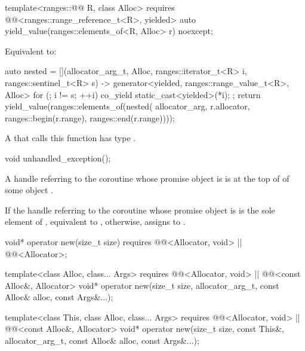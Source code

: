 %
\begin{itemdecl}
template<ranges::@@ R, class Alloc>
  requires @@<ranges::range_reference_t<R>, yielded>
  auto yield_value(ranges::elements_of<R, Alloc> r) noexcept;
\end{itemdecl}

\begin{itemdescr}
\pnum
\effects
Equivalent to:
\begin{codeblock}
auto nested = [](allocator_arg_t, Alloc, ranges::iterator_t<R> i, ranges::sentinel_t<R> s)
  -> generator<yielded, ranges::range_value_t<R>, Alloc> {
    for (; i != s; ++i) {
      co_yield static_cast<yielded>(*i);
    }
  };
return yield_value(ranges::elements_of(nested(
  allocator_arg, r.allocator, ranges::begin(r.range), ranges::end(r.range))));
\end{codeblock}

\pnum
\begin{note}
A  that calls this function
has type .
\end{note}
\end{itemdescr}

%
\begin{itemdecl}
void unhandled_exception();
\end{itemdecl}

\begin{itemdescr}
\pnum
\expects
A handle referring to the coroutine whose promise object is 
is at the top of 
of some  object .

\pnum
\effects
If the handle referring to the coroutine
whose promise object is 
is the sole element of ,
equivalent to ,
otherwise, assigns  to .
\end{itemdescr}

%
\begin{itemdecl}
void* operator new(size_t size)
  requires @@<Allocator, void> || @@<Allocator>;

template<class Alloc, class... Args>
  requires @@<Allocator, void> || @@<const Alloc&, Allocator>
  void* operator new(size_t size, allocator_arg_t, const Alloc& alloc, const Args&...);

template<class This, class Alloc, class... Args>
  requires @@<Allocator, void> || @@<const Alloc&, Allocator>
  void* operator new(size_t size, const This&, allocator_arg_t, const Alloc& alloc,
                     const Args&...);
\end{itemdecl}


